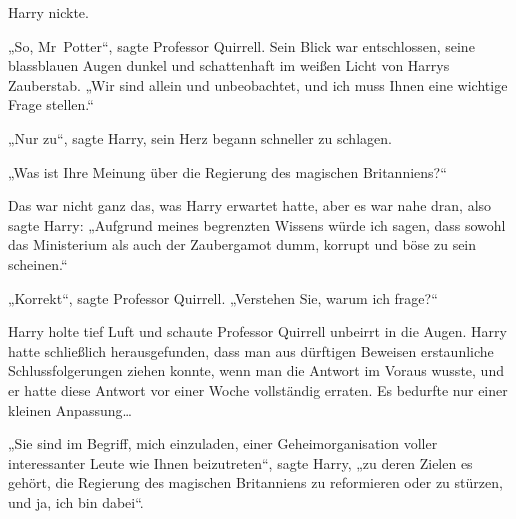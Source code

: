 Harry nickte.

„So, Mr~Potter“, sagte Professor Quirrell. Sein Blick war entschlossen, seine blassblauen Augen dunkel und schattenhaft im weißen Licht von Harrys Zauberstab.
„Wir sind allein und unbeobachtet, und ich muss Ihnen eine wichtige Frage stellen.“

„Nur zu“, sagte Harry, sein Herz begann schneller zu schlagen.

„Was ist Ihre Meinung über die Regierung des magischen Britanniens?“

Das war nicht ganz das, was Harry erwartet hatte, aber es war nahe dran, also sagte Harry:
„Aufgrund meines begrenzten Wissens würde ich sagen, dass sowohl das Ministerium als auch der Zaubergamot dumm, korrupt und böse zu sein scheinen.“

„Korrekt“, sagte Professor Quirrell.
„Verstehen Sie, warum ich frage?“

Harry holte tief Luft und schaute Professor Quirrell unbeirrt in die Augen. Harry hatte schließlich herausgefunden, dass man aus dürftigen Beweisen erstaunliche Schlussfolgerungen ziehen konnte, wenn man die Antwort im Voraus wusste, und er hatte diese Antwort vor einer Woche vollständig erraten. Es bedurfte nur einer kleinen Anpassung…

„Sie sind im Begriff, mich einzuladen, einer Geheimorganisation voller interessanter Leute wie Ihnen beizutreten“, sagte Harry, „zu deren Zielen es gehört, die Regierung des magischen Britanniens zu reformieren oder zu stürzen, und ja, ich bin dabei“.

